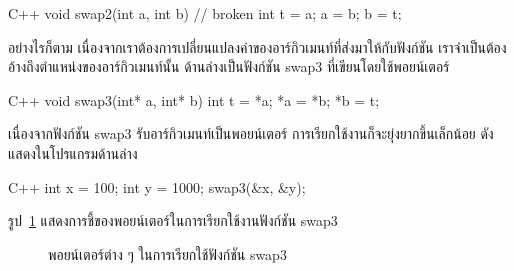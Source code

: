 \latintext
\begin{codelist}{C++}{}
void swap2(int a, int b)    // broken
{
  int t = a;
  a = b;
  b = t;
}
\end{codelist}
\thaitext

อย่างไรก็ตาม เนื่องจาก{\wbr}เรา{\wbr}ต้องการ{\wbr}เปลี่ยนแปลง{\wbr}ค่า{\wbr}ของ{\wbr}อาร์กิวเมนท์{\wbr}ที่{\wbr}ส่ง{\wbr}มา{\wbr}ให้{\wbr}กับ{\wbr}ฟังก์ชัน{\wbr}
เรา{\wbr}จำเป็น{\wbr}ต้อง{\wbr}อ้าง{\wbr}ถึง{\wbr}ตำแหน่ง{\wbr}ของ{\wbr}อาร์กิวเมนท์{\wbr}นั้น ด้าน{\wbr}ล่าง{\wbr}เป็น{\wbr}ฟังก์ชัน {\ct swap3}
ที่{\wbr}เขียน{\wbr}โดย{\wbr}ใช้{\wbr}พอยน์เตอร์

\latintext
\begin{codelist}{C++}{}
void swap3(int* a, int* b)
{
  int t = *a;
  *a = *b;
  *b = t;
}
\end{codelist}
\thaitext

เนื่องจาก{\wbr}ฟังก์ชัน {\ct swap3} รับ{\wbr}อาร์กิวเมนท์{\wbr}เป็น{\wbr}พอยน์เตอร์
การ{\wbr}เรียก{\wbr}ใช้{\wbr}งาน{\wbr}ก็{\wbr}จะ{\wbr}ยุ่งยาก{\wbr}ขึ้น{\wbr}เล็กน้อย ดัง{\wbr}แสดง{\wbr}ใน{\wbr}โปรแกรม{\wbr}ด้าน{\wbr}ล่าง{\wbr}

\latintext
\begin{codelist}{C++}{}
int x = 100;
int y = 1000;
swap3(&x, &y);
\end{codelist}
\thaitext

รูป~\ref{fig:array-swap} แสดง{\wbr}การ{\wbr}ชี้{\wbr}ของ{\wbr}พอยน์เตอร์{\wbr}ใน{\wbr}การ{\wbr}เรียก{\wbr}ใช้{\wbr}งาน{\wbr}ฟังก์ชัน {\ct swap3}

\begin{figure}
\begin{center}
\end{center}
\caption{พอยน์เตอร์{\wbr}ต่าง ๆ ใน{\wbr}การ{\wbr}เรียก{\wbr}ใช้{\wbr}ฟังก์ชัน {\ct swap3}}
\label{fig:array-swap}
\end{figure}


